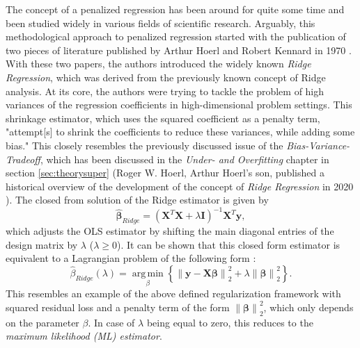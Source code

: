 \documentclass[12pt,a4paper]{article}
\newcommand{\norm}[1]{\left\lVert#1\right\rVert}
\DeclareMathOperator*{\argmin}{arg\,min}
\begin{document}
The concept of a penalized regression has been around for quite some time and been studied widely in various fields of scientific research. Arguably, this methodological approach to penalized regression started with the publication of two pieces of literature published by Arthur Hoerl and Robert Kennard in 1970 \parencite{HoerlKennard1970a, HoerlKennard1970b}. With these two papers, the authors introduced the widely known \textit{Ridge Regression}, which was derived from the previously known concept of Ridge analysis. At its core, the authors were trying to tackle the problem of high variances of the regression coefficients in high-dimensional problem settings. This shrinkage estimator, which uses the squared coefficient as a penalty term, "attempt[s] to shrink the coefficients to
reduce these variances, while adding some bias." \parencite{Hoerl2020} This closely resembles the previously discussed issue of the \textit{Bias-Variance-Tradeoff}, which has been discussed in the \textit{Under- and Overfitting} chapter in section \ref{sec:theorysuper} (Roger W. Hoerl, Arthur Hoerl's son, published a historical overview of the development of the concept of \textit{Ridge Regression} in 2020 \parencite{Hoerl2020}). The closed from solution of the Ridge estimator is given by
$$\hat{\mathbf{\beta}}_{Ridge} = \left(\mathbf{X}^T\mathbf{X}+\lambda \mathbf{I}\right)^{-1}\mathbf{X}^T\mathbf{y},$$
which adjusts the OLS estimator by shifting the main diagonal entries of the design matrix by $\lambda$ ($\lambda \geq 0$). It can be shown that this closed form estimator is equivalent to a Lagrangian problem of the following form \parencite{VanWieringen2015}:
$$\hat{\beta}_{Ridge}(\lambda) = \underset{\beta}{\argmin}\left\{\norm{\mathbf{y}-\mathbf{X}\mathbf{\beta}}_2^2 + \lambda\norm{\mathbf{\beta}}_2^2\right\}.$$
This resembles an example of the above defined regularization framework with squared residual loss and a penalty term of the form $\norm{\mathbf{\beta}}_2^2$, which only depends on the parameter $\beta$. In case of $\lambda$ being equal to zero, this reduces to the \textit{maximum likelihood (ML) estimator}. 
\end{document}
